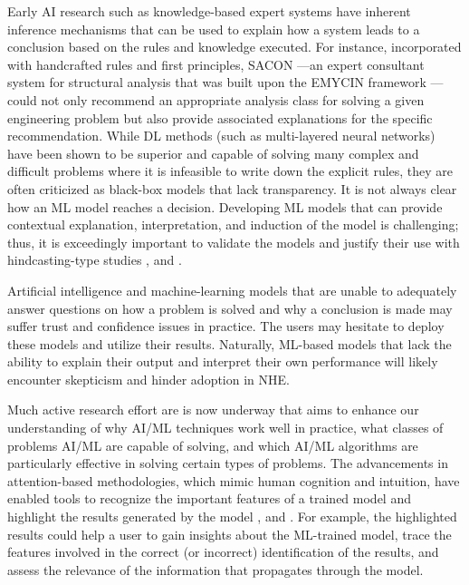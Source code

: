 Early AI research such as knowledge-based expert systems have inherent inference mechanisms that can be used to explain how a system leads to a conclusion based on the rules and knowledge executed. For instance, incorporated with handcrafted rules and first principles, SACON \citep{bennett1978sacon}---an expert consultant system for structural analysis that was built upon the EMYCIN framework \citep{vanmelle1984emycin}---could not only recommend an appropriate analysis class for solving a given engineering problem but also provide associated explanations for the specific recommendation. While DL methods (such as multi-layered neural networks) have been shown to be superior and capable of solving many complex and difficult problems where it is infeasible to write down the explicit rules, they are often criticized as black-box models that lack transparency. It is not always clear how an ML model reaches a decision. Developing ML models that can provide contextual explanation, interpretation, and induction of the model is challenging; thus, it is exceedingly important to validate the models and justify their use with hindcasting-type studies \citep{darpa2016explainable, samek2019explainable}, and \citep{rudin2019why}.

Artificial intelligence and machine-learning models that are unable to adequately answer questions on how a problem is solved and why a conclusion is made may suffer trust and confidence issues in practice. The users may hesitate to deploy these models and utilize their results. Naturally, ML-based models that lack the ability to explain their output and interpret their own performance will likely encounter skepticism and hinder adoption in NHE. 

Much active research effort are is now underway that aims to enhance our understanding of why AI/ML techniques work well in practice, what classes of problems AI/ML are capable of solving, and which AI/ML algorithms are particularly effective in solving certain types of problems. The advancements in attention-based methodologies, which mimic human cognition and intuition, have enabled tools to recognize the important features of a trained model and highlight the results generated by the model \citep{xu2015show,zhou2016learning,kafle2017visual}, and \citep{nakka2018deep}. For example, the highlighted results could help a user to gain insights about the ML-trained model, trace the features involved in the correct (or incorrect) identification of the results, and assess the relevance of the information that propagates through the model.

